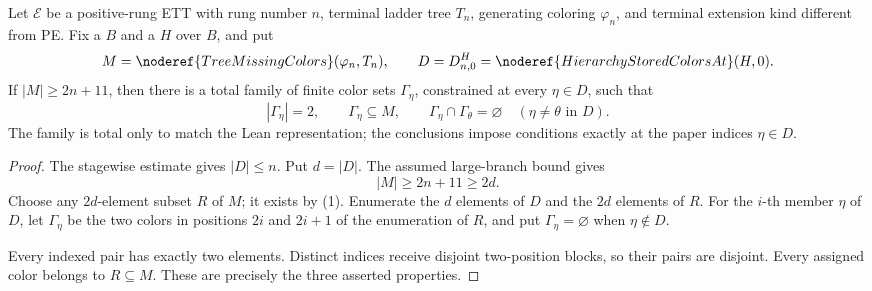 \begin{lemma}
Let $\mathcal E$ be a positive-rung ETT with rung number $n$, terminal
ladder tree $T_n$, generating coloring $\varphi_n$, and terminal extension
kind different from PE.  Fix a  $B$ and a
 $H$ over $B$, and put
\[
 M=\noderef{TreeMissingColors}(\varphi_n,T_n),\qquad
 D=D^H_{n,0}=\noderef{HierarchyStoredColorsAt}(H,0).
\]
If $|M|\geq2n+11$, then there is a total family of finite color sets
$\Gamma_\eta$, constrained at every $\eta\in D$, such that
\[
 |\Gamma_\eta|=2,\qquad \Gamma_\eta\subseteq M,
 \qquad
 \Gamma_\eta\cap\Gamma_\theta=\varnothing
 \quad(\eta\ne\theta\text{ in }D).
\]
The family is total only to match the Lean representation; the conclusions
impose conditions exactly at the paper indices $\eta\in D$.
\end{lemma}
\begin{proof}
The stagewise estimate  gives
$|D|\leq n$.  Put $d=|D|$.  The assumed large-branch bound gives
\[
                         |M|\geq2n+11\geq2d.                  \tag{1}
\]
Choose any $2d$-element subset $R$ of $M$; it exists by (1).  Enumerate
the $d$ elements of $D$ and the $2d$ elements of $R$.  For the $i$-th
member $\eta$ of $D$, let $\Gamma_\eta$ be the two colors in positions
$2i$ and $2i+1$ of the enumeration of $R$, and put
$\Gamma_\eta=\varnothing$ when $\eta\notin D$.

Every indexed pair has exactly two elements.  Distinct indices receive
disjoint two-position blocks, so their pairs are disjoint.  Every assigned
color belongs to $R\subseteq M$.  These are precisely the three asserted
properties.
\end{proof}
